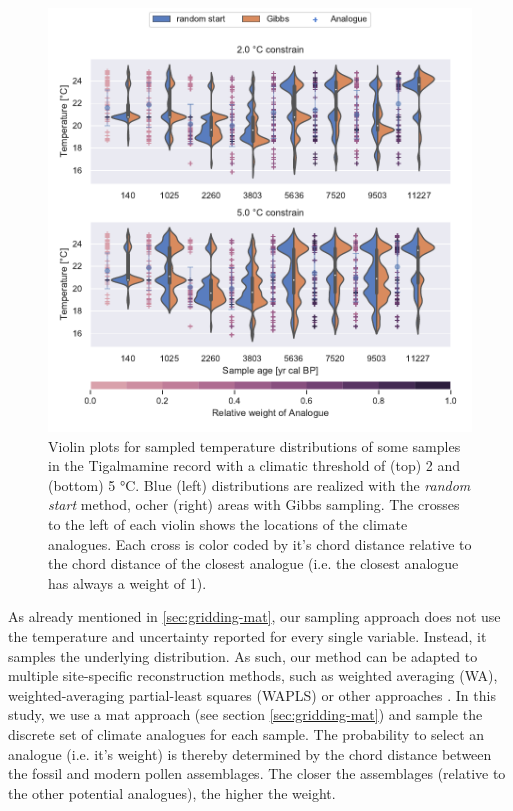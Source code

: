 \begin{refsection}
\begin{figure}[!t]
	\includegraphics[width=\linewidth]{gridding-figures/tigal-sample-climate-violins.pdf}
	\caption[Realized temperature distributions for a few samples]{Violin plots for sampled temperature distributions of some samples in the Tigalmamine record with a climatic threshold of (top) 2 and (bottom) 5 °C. Blue (left) distributions are realized with the \textit{random start} method, ocher (right) areas with Gibbs sampling. The crosses to the left of each violin shows the locations of the climate analogues. Each cross is color coded by it's chord distance relative to the chord distance of the closest analogue (i.e. the closest analogue has always a weight of 1).}
	\label{fig:gridding-temp-sampling-violins}
\end{figure}

As already mentioned in \ref{sec:gridding-mat}, our sampling approach does not use the temperature and uncertainty reported for every single variable. Instead, it samples the underlying distribution. As such, our method can be adapted to multiple site-specific reconstruction methods, such as weighted averaging (WA), weighted-averaging partial-least squares (WAPLS) \citep{BirksBraakLineEtAl1990, BraakJuggins1993} or other approaches \citep[e.g.][]{BirksHeiriSeppaeEtAl2010, BrewerGuiotBarboni2007, Juggins2013}. In this study, we use a \gls{mat} approach (see section \ref{sec:gridding-mat}) and sample the discrete set of climate analogues for each sample. The probability to select an analogue (i.e. it's weight) is thereby determined by the chord distance between the fossil and modern pollen assemblages. The closer the assemblages (relative to the other potential analogues), the higher the weight.


\end{refsection}
